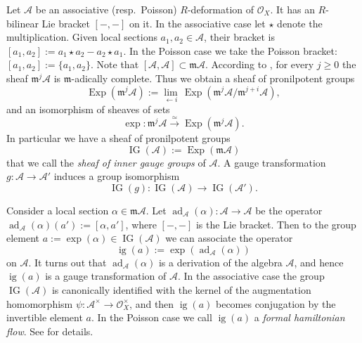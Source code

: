 \documentclass[a4paper, 10pt]{amsart}
\theoremstyle{definition}
\numberwithin{equation}{section}
\newcommand{\iso}{\xrightarrow{\simeq}}
\newcommand{\opn}{\operatorname}
\newcommand{\mfrak}[1]{\mathfrak{#1}}
\newcommand{\mcal}[1]{\mathcal{#1}}
\renewcommand{\AA}{\mcal{A}}
\newcommand{\m}{\mfrak{m}}
\newcommand{\al}{\alpha}
\newcommand{\OX}{\mcal{O}_X}
\begin{document}
Let $\mcal{A}$ be an associative (resp.\ Poisson) $R$-deformation of $\OX$.
It has an $R$-bilinear Lie bracket $[-,-]$ on it. In the associative case let
$\star$ denote the multiplication. Given local sections $a_1,  a_2 \in
\mcal{A}$, their bracket is 
$[a_1,  a_2] := a_1 \star a_2 - a_2 \star a_1$. 
In the Poisson case we take the Poisson bracket:
$[a_1,  a_2] := \{ a_1,  a_2 \}$. 
Note that $[\mcal{A}, \mcal{A}] \subset \m \AA$.
According to \cite[Corollary 3.8]{Ye9}, for every $j \geq 0$ the sheaf 
$\m^j \mcal{A}$ is $\m$-adically complete. Thus we obtain a sheaf of
pronilpotent groups
\begin{equation} \label{eqn:350}
\opn{Exp}(\m^j \mcal{A}) := 
\lim_{\leftarrow i}\, \opn{Exp}(\m^j \mcal{A} / \m^{j+i} \mcal{A}) ,
\end{equation}
and an isomorphism of sheaves of sets
\begin{equation} \label{eqn:351}
\exp : \m^j \AA \iso \opn{Exp}(\m^j \mcal{A}) .
\end{equation}
In particular we have a sheaf of pronilpotent groups
\begin{equation} \label{eqn:230}
\opn{IG}(\mcal{A}) := \opn{Exp}(\m \mcal{A})  
\end{equation}
that we call the {\em sheaf of inner gauge groups} of $\AA$.
A gauge transformation $g : \mcal{A} \to \mcal{A}'$ induces a group isomorphism 
\begin{equation} \label{eqn:234}
\opn{IG}(g) : \opn{IG}(\mcal{A}) \to \opn{IG}(\mcal{A}') .
\end{equation}

Consider a local section $\al \in \m \mcal{A}$.
Let $\opn{ad}_{\mcal{A}}(\al) : \mcal{A} \to \mcal{A}$ be the operator
$\opn{ad}_{\mcal{A}}(\al)(a') := [\al, a']$,
where $[-,-]$ is the Lie bracket. Then to the group element 
$a := \exp(\al) \in \opn{IG}(\mcal{A})$ we can associate the operator 
\begin{equation} \label{eqn:231}
\opn{ig}(a) := \exp( \opn{ad}_{\mcal{A}}(\al) ) 
\end{equation}
on $\mcal{A}$. It turns out that $\opn{ad}_{\mcal{A}}(\al)$ is a derivation of
the algebra $\mcal{A}$, and hence $\opn{ig}(a)$ is a gauge transformation of
$\mcal{A}$. In the associative case the group $\opn{IG}(\mcal{A})$ is
canonically identified with the kernel of the augmentation homomorphism 
$\psi : \mcal{A}^{\times} \to \mcal{O}_X^{\times}$,
and then $\opn{ig}(a)$ becomes conjugation by the invertible element $a$.
In the Poisson case we call $\opn{ig}(a)$ a 
{\em formal hamiltonian flow}.
See \cite[Section 5]{Ye9} for details. 
\end{document}
